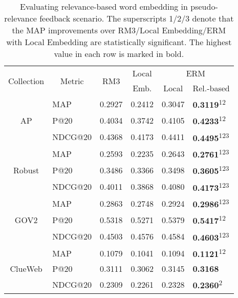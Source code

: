 \documentclass[sigconf]{acmart}
\begin{document}
\begin{table}[t]
\centering
\caption{Evaluating relevance-based word embedding in pseudo-relevance feedback scenario. The superscripts 1/2/3 denote that the MAP improvements over RM3/Local Embedding/ERM with Local Embedding are statistically significant. The highest value in each row is marked in bold.}
\vspace{-0.2cm}
\setlength\tabcolsep{4pt}
\begin{tabular}{|c|l|c|c|c|l|} \hline
\multirow{2}{*}{Collection} & \multicolumn{1}{c|}{\multirow{2}{*}{Metric}} & \multirow{2}{*}{RM3} & Local & \multicolumn{2}{c|}{ERM} {\rule{0pt}{2.6ex}} 
\\ \cline{5-6}
 &  &  & Emb.  & Local & Rel.-based {\rule{0pt}{2.6ex}} 
\\ \hline

\multirow{3}{*}{AP}
& MAP     & 0.2927 & 0.2412 & 0.3047 & \textbf{0.3119}\textsuperscript{12} {\rule{0pt}{2.6ex}}\\
& P@20    & 0.4034 & 0.3742 & 0.4105 & \textbf{0.4233}\textsuperscript{12} \\
& NDCG@20 & 0.4368 & 0.4173 & 0.4411 & \textbf{0.4495}\textsuperscript{123} \\
\hline

\multirow{3}{*}{Robust}
& MAP     & 0.2593 & 0.2235 & 0.2643 & \textbf{0.2761}\textsuperscript{123} {\rule{0pt}{2.6ex}}\\
& P@20    & 0.3486 & 0.3366 & 0.3498 & \textbf{0.3605}\textsuperscript{123} \\
& NDCG@20 & 0.4011 & 0.3868 & 0.4080 & \textbf{0.4173}\textsuperscript{123} \\
\hline

\multirow{3}{*}{GOV2}
& MAP     & 0.2863 & 0.2748 & 0.2924 & \textbf{0.2986}\textsuperscript{123} {\rule{0pt}{2.6ex}}\\
& P@20    & 0.5318 & 0.5271 & 0.5379 & \textbf{0.5417}\textsuperscript{12} \\
& NDCG@20 & 0.4503 & 0.4576 & 0.4584 & \textbf{0.4603}\textsuperscript{123} \\
\hline

\multirow{3}{*}{ClueWeb}
& MAP     & 0.1079 & 0.1041 & 0.1094 & \textbf{0.1121}\textsuperscript{12} {\rule{0pt}{2.6ex}}\\
& P@20    & 0.3111 & 0.3062 & 0.3145 & \textbf{0.3168} \\
& NDCG@20 & 0.2309 & 0.2261 & 0.2328 & \textbf{0.2360}\textsuperscript{2} \\
\hline

\end{tabular}
\label{tab:fb}
\vspace{-0.2cm}
\end{table}
\end{document}
